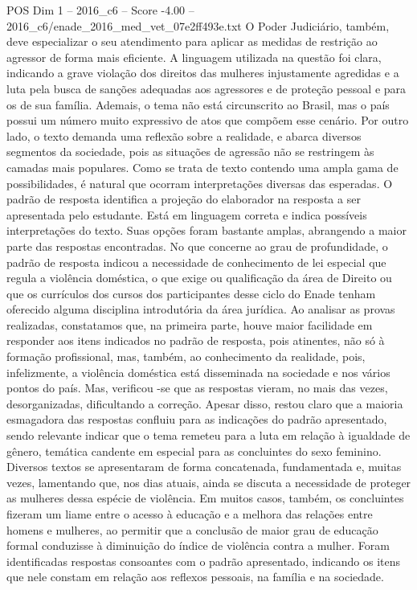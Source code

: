 \begin{textsample}{POS Dim 1 – 2016\_c6 – Score -4.00 – 2016\_c6/enade\_2016\_med\_vet\_07e2ff493e.txt}
O Poder Judiciário, também, deve especializar o seu atendimento para aplicar as medidas de restrição ao agressor de forma mais eficiente.
A linguagem utilizada na questão foi clara, indicando a grave violação dos direitos das mulheres injustamente agredidas e a luta pela busca de sanções adequadas aos agressores e de proteção pessoal e para os de sua família.
Ademais, o tema não está circunscrito ao Brasil, mas o país possui um número muito expressivo de atos que compõem esse cenário.
Por outro lado, o texto demanda uma reflexão sobre a realidade, e abarca diversos segmentos da sociedade, pois as situações de agressão não se restringem às camadas mais populares.
Como se trata de texto contendo uma ampla gama de possibilidades, é natural que ocorram interpretações diversas das esperadas.
O padrão de resposta identifica a projeção do elaborador na resposta a ser apresentada pelo estudante.
Está em linguagem correta e indica possíveis interpretações do texto.
Suas opções foram bastante amplas, abrangendo a maior parte das respostas encontradas.
No que concerne ao grau de profundidade, o padrão de resposta indicou a necessidade de conhecimento de lei especial que regula a violência doméstica, o que exige ou qualificação da área de Direito ou que os currículos dos cursos dos participantes desse ciclo do Enade tenham oferecido alguma disciplina introdutória da área jurídica.
Ao analisar as provas realizadas, constatamos que, na primeira parte, houve maior facilidade em responder aos itens indicados no padrão de resposta, pois atinentes, não só à formação profissional, mas, também, ao conhecimento da realidade, pois, infelizmente, a violência doméstica está disseminada na sociedade e nos vários pontos do país.
Mas, verificou -se que as respostas vieram, no mais das vezes, desorganizadas, dificultando a correção.
Apesar disso, restou claro que a maioria esmagadora das respostas confluiu para as indicações do padrão apresentado, sendo relevante indicar que o tema remeteu para a luta em relação à igualdade de gênero, temática candente em especial para as concluintes do sexo feminino.
Diversos textos se apresentaram de forma concatenada, fundamentada e, muitas vezes, lamentando que, nos dias atuais, ainda se discuta a necessidade de proteger as mulheres dessa espécie de violência.
Em muitos casos, também, os concluintes fizeram um liame entre o acesso à educação e a melhora das relações entre homens e mulheres, ao permitir que a conclusão de maior grau de educação formal conduzisse à diminuição do índice de violência contra a mulher.
Foram identificadas respostas consoantes com o padrão apresentado, indicando os itens que nele constam em relação aos reflexos pessoais, na família e na sociedade.

\end{textsample}
